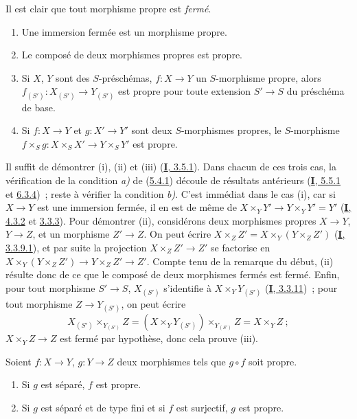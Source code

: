 Il est clair que tout morphisme propre est \emph{fermé}.

\begin{proposition}[5.4.2]
\label{II.5.4.2-fr}
\begin{enumerate}
  \item[\rm{(i)}] Une immersion fermée est un morphisme propre.
  \item[\rm{(ii)}] Le composé de deux morphismes propres est propre.
  \item[\rm{(iii)}] Si $X$, $Y$ sont des $S$-préschémas,
  $f:X\to Y$ un $S$-morphisme propre, alors
  $f_{(S')}:X_{(S')}\to Y_{(S')}$ est propre pour toute extension
  $S'\to S$ du préschéma de base.
  \item[\rm{(iv)}] Si $f:X\to Y$ et $g:X'\to Y'$ sont deux $S$-morphismes
  propres, le $S$-morphisme
  $f\times_Sg:X\times_SX'\to Y\times_SY'$ est propre.
\end{enumerate}
\end{proposition}


Il suffit de démontrer (i), (ii) et (iii) (\hyperref[I.3.5.1-fr]{\textbf{I}, 3.5.1}).
Dans chacun de ces trois cas, la vérification de la condition \emph{a)} de
(\hyperref[II.5.4.1-fr]{5.4.1}) découle de résultats antérieurs
(\hyperref[I.5.5.1-fr]{\textbf{I}, 5.5.1} et \hyperref[I.6.3.4-fr]{6.3.4})~; reste à
vérifier la condition \emph{b)}. C'est immédiat dans le cas (i), car si $X\to Y$
est une immersion fermée, il en est de même de
$X\times_YY'\to Y\times_YY'=Y'$ (\hyperref[I.4.3.2-fr]{\textbf{I}, 4.3.2} et
\hyperref[II.3.3.3-fr]{3.3.3}). Pour démontrer (ii), considérons deux
morphismes propres $X\to Y$, $Y\to Z$, et un morphisme $Z'\to Z$. On peut
écrire $X\times_ZZ'=X\times_Y(Y\times_ZZ')$
(\hyperref[I.3.3.9.1-fr]{\textbf{I}, 3.3.9.1}), et par suite la projection
$X\times_ZZ'\to Z'$ se factorise en
$X\times_Y(Y\times_ZZ')\to Y\times_ZZ'\to Z'$. Compte tenu de la remarque
du début, (ii) résulte donc de ce que le composé de deux morphismes fermés
est fermé. Enfin, pour tout morphisme $S'\to S$, $X_{(S')}$ s'identifie à
$X\times_YY_{(S')}$ (\hyperref[I.3.3.11-fr]{\textbf{I}, 3.3.11})~; pour tout
morphisme $Z\to Y_{(S')}$, on peut écrire
\[
  X_{(S')}\times_{Y_{(S')}}Z
  =(X\times_YY_{(S')})\times_{Y_{(S')}}Z=X\times_YZ~;
\]
$X\times_YZ\to Z$ est fermé par hypothèse, donc cela prouve (iii).

\begin{corollary}[5.4.3]
\label{II.5.4.3-fr}
Soient $f:X\to Y$, $g:Y\to Z$ deux morphismes tels que $g\circ f$ soit
propre.
\begin{enumerate}
  \item[\rm{(i)}] Si $g$ est séparé, $f$ est propre.
  \item[\rm{(ii)}] Si $g$ est séparé et de type fini et si $f$ est
  surjectif, $g$ est propre.
\end{enumerate}
\end{corollary}


